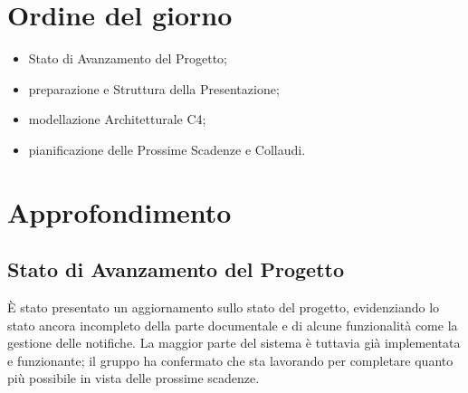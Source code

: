 \documentclass[10pt, letterpaper]{article}
\begin{document}
\makeTitlePage

\newpage

\tableofcontents

\newpage


\makeMeetingParticipantsTable

\section{Ordine del giorno}
\begin{itemize}
      \item Stato di Avanzamento del Progetto;
      \item preparazione e Struttura della Presentazione;
      \item modellazione Architetturale C4;
      \item pianificazione delle Prossime Scadenze e Collaudi.
\end{itemize}

\section{Approfondimento}

\subsection*{Stato di Avanzamento del Progetto}
È stato presentato un aggiornamento sullo stato del progetto, evidenziando lo stato ancora incompleto della parte documentale e di alcune funzionalità come la gestione delle notifiche.
La maggior parte del sistema è tuttavia già implementata e funzionante; il gruppo ha confermato che sta
lavorando per completare quanto più possibile in vista delle prossime scadenze.
\end{document}
